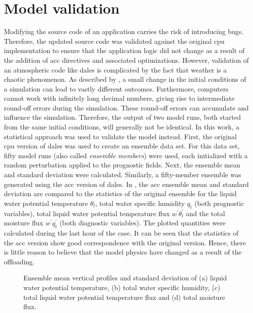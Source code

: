 \section{Model validation}
Modifying the source code of an application carries the risk of introducing bugs. Therefore, the updated source code was validated against the original \acrshort{cpu} implementation to ensure that the application logic did not change as a result of the addition of \acrshort{acc} directives and associated optimizations. However, validation of an atmospheric code like \acrshort{dales} is complicated by the fact that weather is a chaotic phenomenon. As described by \citet{lorenzDeterministicNonperiodicFlow1963}, a small change in the initial conditions of a simulation can lead to vastly different outcomes. Furthermore, computers cannot work with infinitely long decimal numbers, giving rise to intermediate round-off errors during the simulation. These round-off errors can accumulate and influence the simulation. Therefore, the output of two model runs, both started from the same initial conditions, will generally not be identical. In this work, a statistical approach was used to validate the model instead. First, the original \acrshort{cpu} version of \acrshort{dales} was used to create an ensemble data set. For this data set, fifty model runs (also called \emph{ensemble members}) were used, each initialized with a random perturbation applied to the prognostic fields. Next, the ensemble mean and standard deviation were calculated. Similarly, a fifty-member ensemble was generated using the \acrshort{acc} version of \acrshort{dales}. In , the \acrshort{acc} ensemble mean and standard deviation are compared to the statistics of the original ensemble for the liquid water potential temperature $\theta_l$, total water specific humidity $q_t$ (both prognostic variables), total liquid water potential temperature flux $w^\prime \theta_l^\prime$ and the total moisture flux $w^\prime q_t^\prime$ (both diagnostic variables). The plotted quantities were calculated during the last hour of the case. It can be seen that the statistics of the \acrshort{acc} version show good correspondence with the original version. Hence, there is little reason to believe that the model physics have changed as a result of the offloading.

\begin{figure}
    \centering
    
    \caption{Ensemble mean vertical profiles and standard deviation of (a) liquid water potential temperature, (b) total water specific humidity, (c) total liquid water potential temperature flux and (d) total moisture flux.}
    \label{fig:validation}
\end{figure} 

